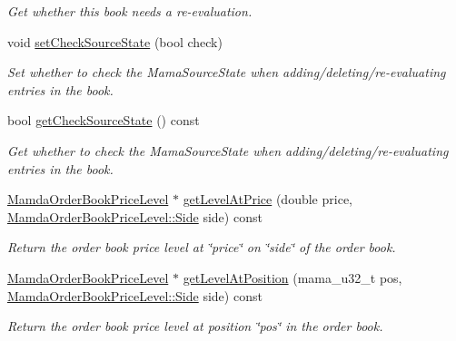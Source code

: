 \begin{CompactItemize}
\begin{CompactList}\small\item\em Get whether this book needs a re-evaluation. \item\end{CompactList}\item 
void \hyperlink{classWombat_1_1MamdaOrderBook_eae6354d517d13eeb4cae589c888802b}{set\-Check\-Source\-State} (bool check)
\begin{CompactList}\small\item\em Set whether to check the Mama\-Source\-State when adding/deleting/re-evaluating entries in the book. \item\end{CompactList}\item 
bool \hyperlink{classWombat_1_1MamdaOrderBook_f975146a011165fdd0230f88f4a6f1cf}{get\-Check\-Source\-State} () const 
\begin{CompactList}\small\item\em Get whether to check the Mama\-Source\-State when adding/deleting/re-evaluating entries in the book. \item\end{CompactList}\item 
\hyperlink{classWombat_1_1MamdaOrderBookPriceLevel}{Mamda\-Order\-Book\-Price\-Level} $\ast$ \hyperlink{classWombat_1_1MamdaOrderBook_1a16eb4ec553883692be61f800e4fbfc}{get\-Level\-At\-Price} (double price, \hyperlink{classWombat_1_1MamdaOrderBookPriceLevel_384c34b0a74d874b8969dee9b0d3718d}{Mamda\-Order\-Book\-Price\-Level::Side} side) const 
\begin{CompactList}\small\item\em Return the order book price level at \char`\"{}price\char`\"{} on \char`\"{}side\char`\"{} of the order book. \item\end{CompactList}\item 
\hyperlink{classWombat_1_1MamdaOrderBookPriceLevel}{Mamda\-Order\-Book\-Price\-Level} $\ast$ \hyperlink{classWombat_1_1MamdaOrderBook_6fbc8b88d867547a29097a5a39ccf4ca}{get\-Level\-At\-Position} (mama\_\-u32\_\-t pos, \hyperlink{classWombat_1_1MamdaOrderBookPriceLevel_384c34b0a74d874b8969dee9b0d3718d}{Mamda\-Order\-Book\-Price\-Level::Side} side) const 
\begin{CompactList}\small\item\em Return the order book price level at position \char`\"{}pos\char`\"{} in the order book. \item\end{CompactList}\item 

\end{CompactItemize}

